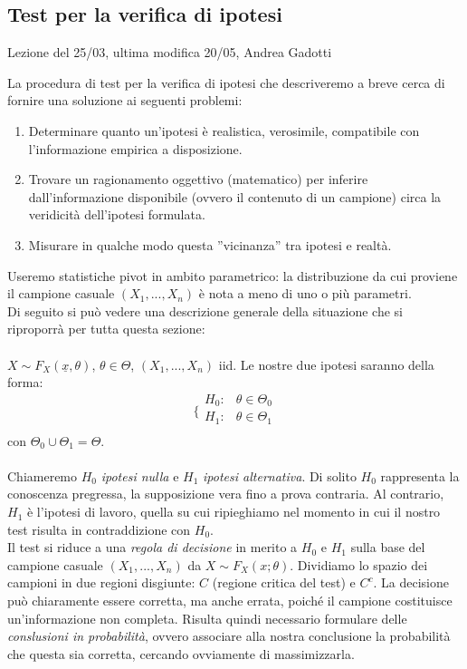 

\subsection{Test per la verifica di ipotesi}
Lezione del 25/03, ultima modifica 20/05, Andrea Gadotti


La procedura di test per la verifica di ipotesi che descriveremo a breve cerca di fornire una soluzione ai seguenti problemi:
\begin{enumerate}
\item Determinare quanto un'ipotesi è realistica, verosimile, compatibile con l'informazione empirica a disposizione.
\item Trovare un ragionamento oggettivo (matematico) per inferire dall'informazione disponibile (ovvero il contenuto di un campione) circa la veridicità dell'ipotesi formulata.
\item Misurare in qualche modo questa ''vicinanza'' tra ipotesi e realtà.
\end{enumerate}
Useremo statistiche pivot in ambito parametrico: la distribuzione da cui proviene il campione casuale $(X_1,...,X_n)$ è nota a meno di uno o più parametri.\\
Di seguito si può vedere una descrizione generale della situazione che si riproporrà per tutta questa sezione:\\
\\
$X \sim F_X(\underline{x},\theta)$, $\theta \in \Theta$, $(X_1,...,X_n)$ iid. Le nostre due ipotesi saranno della forma:
$$\bigg \{
\begin{array}{rl}
H_0: & \theta \in \Theta_0 \\
H_1: & \theta \in \Theta_1 \\
\end{array}
$$
con $\Theta_0 \cup \Theta_1 = \Theta$.\\
\\
Chiameremo $H_0$ \textit{ipotesi nulla} e $H_1$ \textit{ipotesi alternativa}. Di solito $H_0$ rappresenta la conoscenza pregressa, la supposizione vera fino a prova contraria. Al contrario, $H_1$ è l'ipotesi di lavoro, quella su cui ripieghiamo nel momento in cui il nostro test risulta in contraddizione con $H_0$.\\
Il test si riduce a una \textit{regola di decisione} in merito a $H_0$ e $H_1$ sulla base del campione casuale $(X_1,...,X_n)$ da $X \sim F_X (x;\theta)$. Dividiamo lo spazio dei campioni in due regioni disgiunte: $C$ (regione critica del test) e $C^c$. La decisione può chiaramente essere corretta, ma anche errata, poiché il campione costituisce un'informazione non completa. Risulta quindi necessario formulare delle \textit{conslusioni in probabilità}, ovvero associare alla nostra conclusione la probabilità che questa sia corretta, cercando ovviamente di massimizzarla.\\
